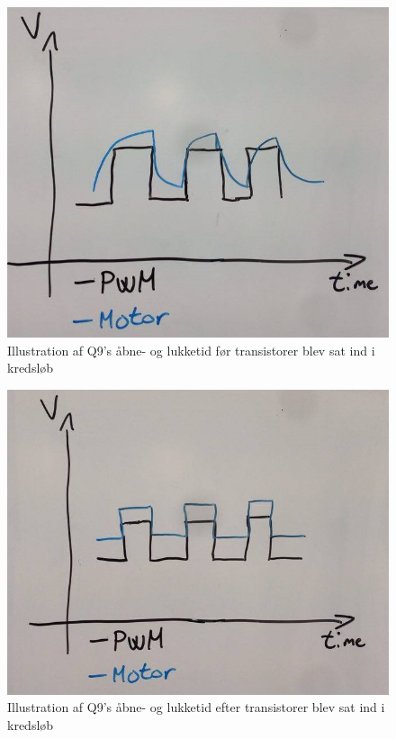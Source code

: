 \begin{figure}[H]
	\centering
	\includegraphics[width=0.3\paperwidth]{Afsnit/DesignOgImplementering/images/mof}
	\caption{Illustration af Q9's åbne- og lukketid før transistorer blev sat ind i kredsløb}
	\label{fig:mof}
\end{figure}

\begin{figure}[H]
	\centering
	\includegraphics[width=0.3\paperwidth]{Afsnit/DesignOgImplementering/images/moe}
	\caption{Illustration af Q9's åbne- og lukketid efter transistorer blev sat ind i kredsløb}
	\label{fig:moe}
\end{figure}

